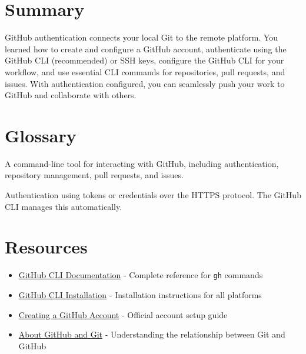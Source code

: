 \documentclass[
  letterpaper,
  DIV=11,
  numbers=noendperiod]{scrreprt}
\providecommand{\tightlist}{%
  \setlength{\itemsep}{0pt}\setlength{\parskip}{0pt}}
\begin{document}
\section{Summary}\label{summary-11}

GitHub authentication connects your local Git to the remote platform.
You learned how to create and configure a GitHub account, authenticate
using the GitHub CLI (recommended) or SSH keys, configure the GitHub CLI
for your workflow, and use essential CLI commands for repositories, pull
requests, and issues. With authentication configured, you can seamlessly
push your work to GitHub and collaborate with others.

\section{Glossary}\label{glossary-11}

\begin{description}
\tightlist
\item[\textbf{GitHub CLI (gh)}]
A command-line tool for interacting with GitHub, including
authentication, repository management, pull requests, and issues.
\item[\textbf{HTTPS Authentication}]
Authentication using tokens or credentials over the HTTPS protocol. The
GitHub CLI manages this automatically.
\end{description}

\section{Resources}\label{resources-3}

\begin{itemize}
\tightlist
\item
  \href{https://cli.github.com/manual/}{GitHub CLI Documentation} -
  Complete reference for \texttt{gh} commands
\item
  \href{https://github.com/cli/cli\#installation}{GitHub CLI
  Installation} - Installation instructions for all platforms
\item
  \href{https://docs.github.com/en/get-started/start-your-journey/creating-an-account-on-github}{Creating
  a GitHub Account} - Official account setup guide
\item
  \href{https://docs.github.com/en/get-started/start-your-journey/about-github-and-git}{About
  GitHub and Git} - Understanding the relationship between Git and
  GitHub
\end{itemize}
\end{document}
